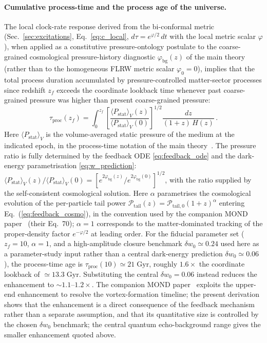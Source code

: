 \documentclass[aps,prd,onecolumn,superscriptaddress,nofootinbib,showpacs,12pt,notitlepage]{revtex4-2}
\begin{document}
\paragraph{Cumulative process-time and the process age of the universe.}
The local clock-rate response derived from the bi-conformal
metric (Sec.~\ref{sec:excitations}, Eq.~\ref{eq:c_local},
$d\tau=e^{\varphi/2}\,dt$ with the local metric scalar
$\varphi$), when applied as a constitutive pressure-ontology
postulate to the coarse-grained cosmological pressure-history
diagnostic $\varphi_{\mathrm{bg}}(z)$ of the main theory
(rather than to the homogeneous FLRW metric scalar
$\varphi_0=0$), implies that the total process duration
accumulated by pressure-controlled matter-sector processes
since redshift $z_f$ exceeds the coordinate lookback time
whenever past coarse-grained pressure was higher than present
coarse-grained pressure:
\begin{equation}\label{eq:tau_proc_q}
  \tau_{\mathrm{proc}}(z_f)
  = \int_0^{z_f}
    \left[
      \frac{\langle P_{\mathrm{stat}}\rangle_V(z)}
           {\langle P_{\mathrm{stat}}\rangle_V(0)}
    \right]^{1/2}
    \frac{dz}{(1+z)\,H(z)}\,.
\end{equation}
Here $\langle P_{\mathrm{stat}}\rangle_V$ is the
volume-averaged static pressure of the medium at the
indicated epoch, in the process-time notation of the
main theory~\cite{Lotishvili2026}.  The pressure ratio
is fully determined by the feedback ODE
\eqref{eq:feedback_ode} and the dark-energy parametrisation
\eqref{eq:w_prediction}:
$\langle P_{\mathrm{stat}}\rangle_V(z)/
\langle P_{\mathrm{stat}}\rangle_V(0)
= [e^{2\varphi_{\mathrm{bg}}(z)}/
e^{2\varphi_{\mathrm{bg}}(0)}]^{1/2}$, with the ratio
supplied by the self-consistent cosmological solution.
Here $\alpha$ parametrises the cosmological evolution of the per-particle
tail power
$\mathcal{P}_{\mathrm{tail}}(z)
= \mathcal{P}_{\mathrm{tail},0}(1+z)^{\alpha}$ entering
Eq.~(\ref{eq:feedback_cosmo}), in the convention used by the
companion MOND paper~\cite{Lotishvili2026MOND} (their Eq.~70);
$\alpha = 1$ corresponds to the matter-dominated tracking
of the proper-density factor $e^{-\varphi/2}$ at leading order.
For the fiducial parameter set
($z_f=10$, $\alpha=1$, and a high-amplitude closure benchmark
$\delta w_0\simeq 0.24$ used here as a parameter-study input
rather than a central dark-energy prediction
$\delta w_0\simeq 0.06$), the process-time age is
$\tau_{\mathrm{proc}}(10)\simeq 21\;\mathrm{Gyr}$, roughly
$1.6\times$ the coordinate lookback of $\simeq 13.3\;
\mathrm{Gyr}$.  Substituting the central
$\delta w_0 = 0.06$ instead reduces the enhancement to
$\sim 1.1$--$1.2\times$.  The companion MOND
paper~\cite{Lotishvili2026MOND} exploits the upper-end
enhancement to resolve the vortex-formation timeline;
the present derivation shows that the enhancement is a
direct consequence of the feedback mechanism rather than
a separate assumption, and that its quantitative size is
controlled by the chosen $\delta w_0$ benchmark; the
central quantum echo-background range gives the smaller
enhancement quoted above.
\end{document}
